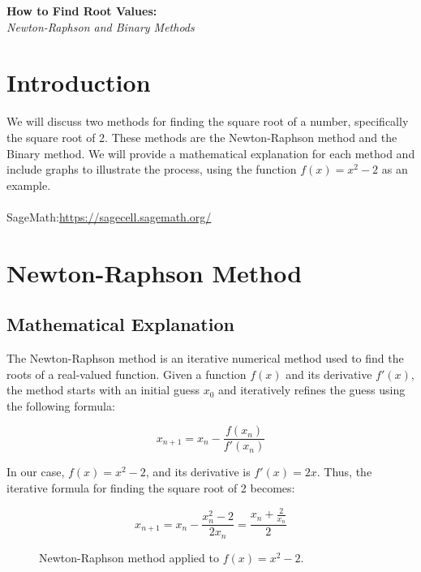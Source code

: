 \documentclass{article}
\theoremstyle{definition}
\begin{document}
\begin{center}
	\huge\textbf{How to Find Root Values:}\\
	\Large\textit{Newton-Raphson and Binary Methods}\\
	\vspace{0.5em}
\end{center}

\section{Introduction}

We will discuss two methods for finding the square root of a number, specifically the square root of 2. These methods are the Newton-Raphson method and the Binary method. We will provide a mathematical explanation for each method and include graphs to illustrate the process, using the function $f(x) = x^2 - 2$ as an example.\\
\\
SageMath:\url{https://sagecell.sagemath.org/}

\section{Newton-Raphson Method}

\subsection{Mathematical Explanation}

The Newton-Raphson method is an iterative numerical method used to find the roots of a real-valued function. Given a function $f(x)$ and its derivative $f'(x)$, the method starts with an initial guess $x_0$ and iteratively refines the guess using the following formula:

\[
x_{n+1} = x_n - \frac{f(x_n)}{f'(x_n)}
\]

In our case, $f(x) = x^2 - 2$, and its derivative is $f'(x) = 2x$. Thus, the iterative formula for finding the square root of 2 becomes:

\[
x_{n+1} = x_n - \frac{x_n^2 - 2}{2x_n} = \frac{x_n + \frac{2}{x_n}}{2}
\]

\begin{figure}[ht]
	\centering
	\caption{Newton-Raphson method applied to $f(x) = x^2 - 2$.}
\end{figure}
\end{document}
